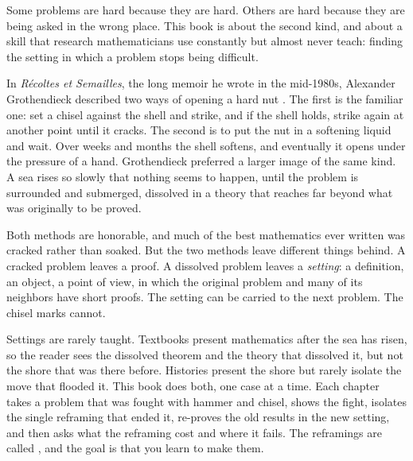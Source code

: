 \begin{refsection}

Some problems are hard because they are hard. Others are hard because they are being asked in the wrong place. This book is about the second kind, and about a skill that research mathematicians use constantly but almost never teach: finding the setting in which a problem stops being difficult.


In \emph{R\'ecoltes et Semailles}, the long memoir he wrote in the mid-1980s, Alexander Grothendieck described two ways of opening a hard nut \parencite{Grothendieck2022}. The first is the familiar one: set a chisel against the shell and strike, and if the shell holds, strike again at another point until it cracks. The second is to put the nut in a softening liquid and wait. Over weeks and months the shell softens, and eventually it opens under the pressure of a hand. Grothendieck preferred a larger image of the same kind. A sea rises so slowly that nothing seems to happen, until the problem is surrounded and submerged, dissolved in a theory that reaches far beyond what was originally to be proved.

Both methods are honorable, and much of the best mathematics ever written was cracked rather than soaked. But the two methods leave different things behind. A cracked problem leaves a proof. A dissolved problem leaves a \emph{setting}: a definition, an object, a point of view, in which the original problem and many of its neighbors have short proofs. The setting can be carried to the next problem. The chisel marks cannot.

Settings are rarely taught. Textbooks present mathematics after the sea has risen, so the reader sees the dissolved theorem and the theory that dissolved it, but not the shore that was there before. Histories present the shore but rarely isolate the move that flooded it. This book does both, one case at a time. Each chapter takes a problem that was fought with hammer and chisel, shows the fight, isolates the single reframing that ended it, re-proves the old results in the new setting, and then asks what the reframing cost and where it fails. The reframings are called , and the goal is that you learn to make them.


\end{refsection}
